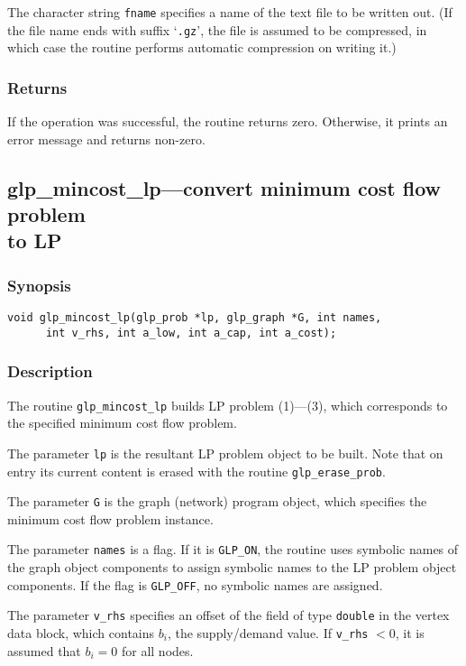 The character string \verb|fname| specifies a name of the text file to
be written out. (If the file name ends with suffix `\verb|.gz|', the
file is assumed to be compressed, in which case the routine performs
automatic compression on writing it.)

\subsubsection*{Returns}

If the operation was successful, the routine returns zero. Otherwise,
it prints an error message and returns non-zero.

\newpage

\subsection{glp\_mincost\_lp---convert minimum cost flow problem\\to LP}

\subsubsection*{Synopsis}

\begin{verbatim}
void glp_mincost_lp(glp_prob *lp, glp_graph *G, int names,
      int v_rhs, int a_low, int a_cap, int a_cost);
\end{verbatim}

\subsubsection*{Description}

The routine \verb|glp_mincost_lp| builds LP problem (1)---(3), which
corresponds to the specified minimum cost flow problem.

The parameter \verb|lp| is the resultant LP problem object to be built.
Note that on entry its current content is erased with the routine
\verb|glp_erase_prob|.

The parameter \verb|G| is the graph (network) program object, which
specifies the minimum cost flow problem instance.

The parameter \verb|names| is a flag. If it is \verb|GLP_ON|, the
routine uses symbolic names of the graph object components to assign
symbolic names to the LP problem object components. If the flag is
\verb|GLP_OFF|, no symbolic names are assigned.

The parameter \verb|v_rhs| specifies an offset of the field of type
\verb|double| in the vertex data block, which contains $b_i$, the
supply/demand value. If \verb|v_rhs| $<0$, it is assumed that $b_i=0$
for all nodes.


